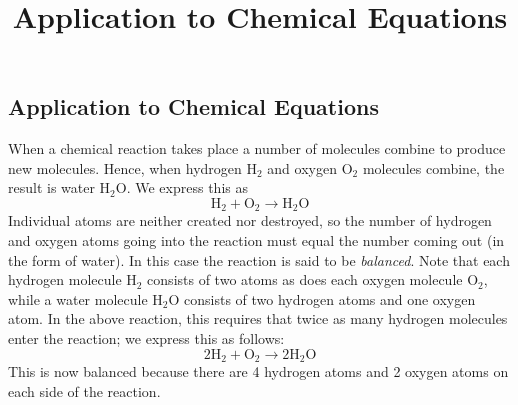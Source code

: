 \documentclass{ximera}
\title{Application to Chemical Equations} \license{CC BY-NC-SA 4.0}
\begin{document}
\begin{abstract}

\end{abstract}
\maketitle

\begin{onlineOnly}
\section*{Application to Chemical Equations}
\end{onlineOnly}

When a chemical reaction takes place a number of molecules combine to produce new molecules. Hence, when hydrogen $\mbox{H}_2$ and oxygen $\mbox{O}_2$ molecules combine, the result is water $\mbox{H}_2\mbox{O}$. We express this as
\begin{equation*}
\mbox{H}_2 + \mbox{O}_2 \rightarrow \mbox{H}_2\mbox{O}
\end{equation*}
Individual atoms are neither created nor destroyed, so the number of hydrogen and oxygen atoms going into the reaction must equal the number coming out (in the form of water). In
this case the reaction is said to be \textit{balanced}. Note that each hydrogen molecule $\mbox{H}_2$ consists of two atoms as does each oxygen molecule $\mbox{O}_2$, while a water molecule $\mbox{H}_2\mbox{O}$ consists of two hydrogen atoms and one oxygen atom. In the above reaction, this requires that twice as many hydrogen molecules enter the reaction; we express this as follows:
\begin{equation*}
2\mbox{H}_2 + \mbox{O}_2 \rightarrow 2\mbox{H}_2\mbox{O}
\end{equation*}
This is now balanced because there are 4 hydrogen atoms and 2 oxygen atoms on each side of the reaction.
\end{document}
